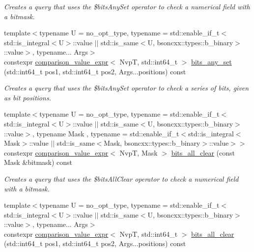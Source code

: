 \begin{DoxyCompactItemize}
\begin{DoxyCompactList}\small\item\em Creates a query that uses the \$bits\+Any\+Set operator to check a numerical field with a bitmask. \end{DoxyCompactList}\item 
{\footnotesize template$<$typename U  = no\+\_\+opt\+\_\+type, typename  = std\+::enable\+\_\+if\+\_\+t$<$std\+::is\+\_\+integral$<$\+U$>$\+::value $\vert$$\vert$                                          std\+::is\+\_\+same$<$\+U, bsoncxx\+::types\+::b\+\_\+binary$>$\+::value$>$, typename... Args$>$ }\\constexpr \hyperlink{classmangrove_1_1comparison__value__expr}{comparison\+\_\+value\+\_\+expr}$<$ NvpT, std\+::int64\+\_\+t $>$ \hyperlink{classmangrove_1_1nvp__base_a9108a3aed96ae225f2bb10a927581a31}{bits\+\_\+any\+\_\+set} (std\+::int64\+\_\+t pos1, std\+::int64\+\_\+t pos2, Args...\+positions) const 
\begin{DoxyCompactList}\small\item\em Creates a query that uses the \$bits\+Any\+Set operator to check a series of bits, given as bit positions. \end{DoxyCompactList}\item 
{\footnotesize template$<$typename U  = no\+\_\+opt\+\_\+type, typename  = std\+::enable\+\_\+if\+\_\+t$<$std\+::is\+\_\+integral$<$\+U$>$\+::value $\vert$$\vert$                                          std\+::is\+\_\+same$<$\+U, bsoncxx\+::types\+::b\+\_\+binary$>$\+::value$>$, typename Mask , typename  = std\+::enable\+\_\+if\+\_\+t$<$std\+::is\+\_\+integral$<$\+Mask$>$\+::value $\vert$$\vert$                                          std\+::is\+\_\+same$<$\+Mask, bsoncxx\+::types\+::b\+\_\+binary$>$\+::value$>$$>$ }\\constexpr \hyperlink{classmangrove_1_1comparison__value__expr}{comparison\+\_\+value\+\_\+expr}$<$ NvpT, Mask $>$ \hyperlink{classmangrove_1_1nvp__base_a59b7d75e874fb7858c0f6ef11e76ce90}{bits\+\_\+all\+\_\+clear} (const Mask \&bitmask) const 
\begin{DoxyCompactList}\small\item\em Creates a query that uses the \$bits\+All\+Clear operator to check a numerical field with a bitmask. \end{DoxyCompactList}\item 
{\footnotesize template$<$typename U  = no\+\_\+opt\+\_\+type, typename  = std\+::enable\+\_\+if\+\_\+t$<$std\+::is\+\_\+integral$<$\+U$>$\+::value $\vert$$\vert$                                          std\+::is\+\_\+same$<$\+U, bsoncxx\+::types\+::b\+\_\+binary$>$\+::value$>$, typename... Args$>$ }\\constexpr \hyperlink{classmangrove_1_1comparison__value__expr}{comparison\+\_\+value\+\_\+expr}$<$ NvpT, std\+::int64\+\_\+t $>$ \hyperlink{classmangrove_1_1nvp__base_a7ca9a391784ef4ff99efd8a1f688f865}{bits\+\_\+all\+\_\+clear} (std\+::int64\+\_\+t pos1, std\+::int64\+\_\+t pos2, Args...\+positions) const 

\end{DoxyCompactItemize}
